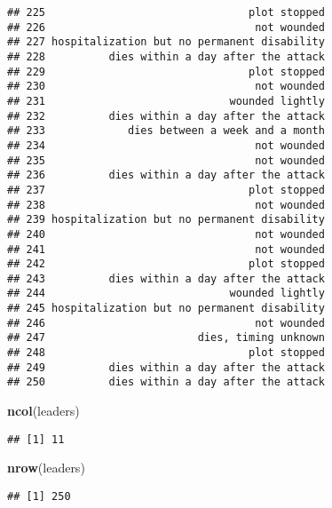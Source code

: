 \documentclass[
]{article}
\newenvironment{Shaded}{\begin{snugshade}}{\end{snugshade}}
\newcommand{\CommentTok}[1]{\textcolor[rgb]{0.56,0.35,0.01}{\textit{#1}}}
\newcommand{\KeywordTok}[1]{\textcolor[rgb]{0.13,0.29,0.53}{\textbf{#1}}}
\newcommand{\NormalTok}[1]{#1}
\begin{document}
\begin{verbatim}
## 225                                plot stopped
## 226                                 not wounded
## 227 hospitalization but no permanent disability
## 228          dies within a day after the attack
## 229                                plot stopped
## 230                                 not wounded
## 231                             wounded lightly
## 232          dies within a day after the attack
## 233             dies between a week and a month
## 234                                 not wounded
## 235                                 not wounded
## 236          dies within a day after the attack
## 237                                plot stopped
## 238                                 not wounded
## 239 hospitalization but no permanent disability
## 240                                 not wounded
## 241                                 not wounded
## 242                                plot stopped
## 243          dies within a day after the attack
## 244                             wounded lightly
## 245 hospitalization but no permanent disability
## 246                                 not wounded
## 247                        dies, timing unknown
## 248                                plot stopped
## 249          dies within a day after the attack
## 250          dies within a day after the attack
\end{verbatim}

\begin{Shaded}
\begin{Highlighting}[]
\KeywordTok{ncol}\NormalTok{(leaders)}
\end{Highlighting}
\end{Shaded}

\begin{verbatim}
## [1] 11
\end{verbatim}

\begin{Shaded}
\begin{Highlighting}[]
\KeywordTok{nrow}\NormalTok{(leaders)}
\end{Highlighting}
\end{Shaded}

\begin{verbatim}
## [1] 250
\end{verbatim}

\begin{Shaded}
\end{Shaded}
\end{document}
